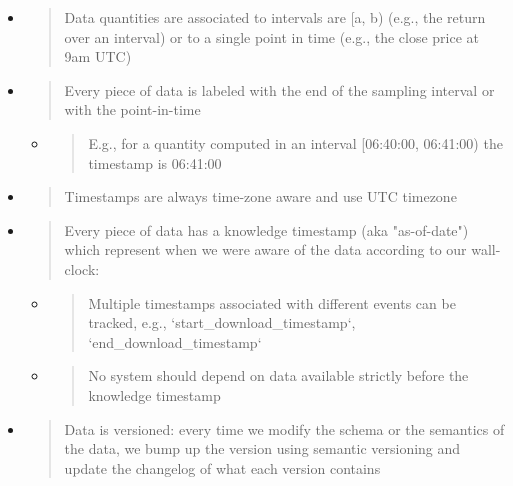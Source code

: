 \documentclass[11pt, reqno]{amsart}
\begin{document}
\begin{itemize}
\item
  \begin{quote}
  Data quantities are associated to intervals are {[}a, b) (e.g., the
  return over an interval) or to a single point in time (e.g., the close
  price at 9am UTC)
  \end{quote}
\item
  \begin{quote}
  Every piece of data is labeled with the end of the sampling interval
  or with the point-in-time
  \end{quote}

  \begin{itemize}
  \item
    \begin{quote}
    E.g., for a quantity computed in an interval {[}06:40:00, 06:41:00)
    the timestamp is 06:41:00
    \end{quote}
  \end{itemize}
\item
  \begin{quote}
  Timestamps are always time-zone aware and use UTC timezone
  \end{quote}
\item
  \begin{quote}
  Every piece of data has a knowledge timestamp (aka "as-of-date") which
  represent when we were aware of the data according to our wall-clock:
  \end{quote}

  \begin{itemize}
  \item
    \begin{quote}
    Multiple timestamps associated with different events can be tracked,
    e.g., `start\_download\_timestamp`, `end\_download\_timestamp`
    \end{quote}
  \item
    \begin{quote}
    No system should depend on data available strictly before the
    knowledge timestamp
    \end{quote}
  \end{itemize}
\item
  \begin{quote}
  Data is versioned: every time we modify the schema or the semantics of
  the data, we bump up the version using semantic versioning and update
  the changelog of what each version contains
  \end{quote}
\end{itemize}
\end{document}
